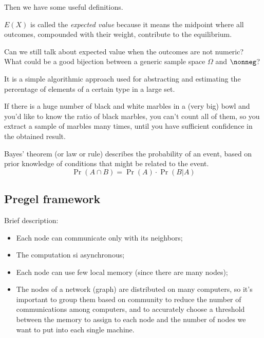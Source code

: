     Then we have some useful definitions.
    
    \begin{defn}
        $E(X)$ is called the \textit{expected value} because it means the midpoint where all outcomes, compounded with their weight, contribute to the equilibrium.
        
        \begin{qst}
            Can we still talk about expected value when the outcomes are not numeric? What could be a good bijection between a generic sample space $\Omega$ and $\nonneg$?
        \end{qst}
    \end{defn}
    
    \begin{defn}[Sampling]
        It is a simple algorithmic approach used for abstracting and estimating the percentage of elements of a certain type in a large set.
        
        \ex If there is a huge number of black and white marbles in a (very big) bowl and you'd like to know the ratio of black marbles, you can't count all of them, so you extract a sample of marbles many times, until you have sufficient confidence in the obtained result.
    \end{defn}
    
    \begin{defn}
        Bayes’ theorem (or law or rule) describes the probability of an event, based on prior knowledge of conditions that might be related to the event.
        \begin{equation}\label{eq-bayes}
            \Pr{(A \cap B)} = \Pr{(A)} \cdot \Pr{(B | A)}
        \end{equation}
    \end{defn}


\subsection{Pregel framework}

    Brief description:
    \begin{itemize}
        \item Each node can communicate only with its neighbors;
        \item The computation si asynchronous;
        \item Each node can use few local memory (since there are many nodes);
        \item The nodes of a network (graph) are distributed on many computers, so it's important to group them based on community to reduce the number of communications among computers, and to accurately choose a threshold between the memory to assign to each node and the number of nodes we want to put into each single machine.
    \end{itemize}
    
